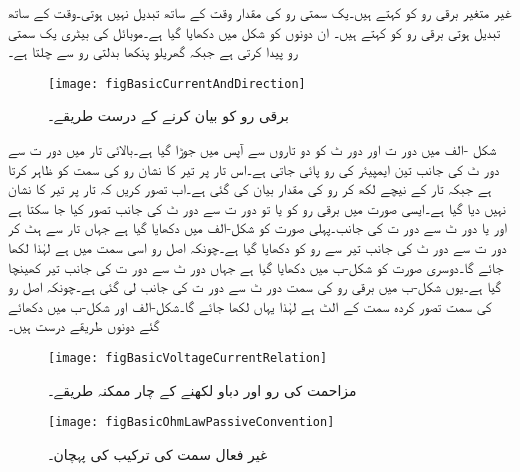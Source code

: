 غیر متغیر برقی رو کو  کہتے ہیں۔یک سمتی رو کی مقدار وقت کے ساتھ تبدیل نہیں ہوتی۔وقت کے ساتھ تبدیل ہوتی برقی رو کو  کہتے ہیں۔ ان دونوں کو شکل میں دکھایا گیا ہے۔موبائل کی بیٹری یک سمتی رو پیدا کرتی ہے جبکہ گھریلو پنکھا بدلتی رو سے چلتا ہے۔
\begin{figure}
\centering
\texttt{[image: figBasicCurrentAndDirection]}
\caption{برقی رو کو بیان کرنے کے درست طریقے۔}
\label{شکل_بنیادی_رو_درست_بیان}
\end{figure}

شکل -الف میں دور ت اور دور ٹ کو دو تاروں سے آپس میں جوڑا گیا ہے۔بالائی تار میں دور ت سے دور ٹ کی جانب تین ایمپیئر کی رو پائی جاتی ہے۔اس تار پر تیر کا نشان رو کی سمت کو ظاہر کرتا ہے جبکہ تار کے نیچے  لکھ کر رو کی مقدار بیان کی گئی ہے۔اب تصور کریں کہ تار پر تیر کا نشان نہیں دیا گیا ہے۔ایسی صورت میں برقی رو  کو یا تو دور ت سے دور ٹ کی جانب تصور کیا جا سکتا ہے اور یا دور ٹ سے دور ت کی جانب۔پہلی صورت کو شکل-الف میں دکھایا گیا ہے جہاں تار سے ہٹ کر دور ت سے دور ٹ کی جانب تیر سے رو  کو دکھایا گیا ہے۔چونکہ اصل رو اسی سمت میں ہے لہٰذا  لکھا جائے گا۔دوسری صورت کو شکل-ب میں دکھایا گیا ہے جہاں دور ٹ سے دور ت کی جانب تیر کھینچا گیا ہے۔یوں شکل-ب میں برقی رو کی سمت دور ٹ سے دور ت کی جانب لی گئی ہے۔چونکہ اصل رو کی سمت تصور کردہ سمت کے الٹ ہے لہٰذا یہاں  لکھا جائے گا۔شکل-الف اور شکل-ب میں دکھائے گئے دونوں طریقے درست ہیں۔
\begin{figure}
\centering
\texttt{[image: figBasicVoltageCurrentRelation]}
\caption{مزاحمت کی رو اور دباو لکھنے کے چار ممکنہ طریقے۔}
\label{شکل_بنیادی_غیر_عامل_ترکیب}
\end{figure}
%
\begin{figure}
\centering
\texttt{[image: figBasicOhmLawPassiveConvention]}
\caption{غیر فعال سمت کی ترکیب کی پہچان۔}
\label{شکل_بنیادی_غیر_عامل_ترکیب_پہچان}
\end{figure}


